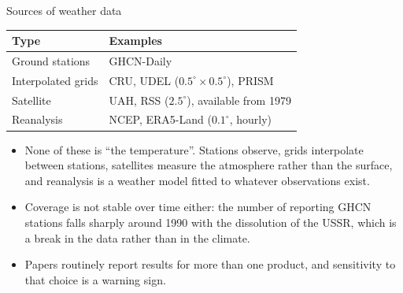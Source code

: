 \documentclass[aspectratio=169,10pt]{beamer}
\begin{document}
\begin{frame}{Sources of weather data}
  \begin{center}
    \small
    \begin{tabular}{@{}L{0.22\textwidth}L{0.58\textwidth}@{}}
      \toprule
      \textbf{Type} & \textbf{Examples} \\
      \midrule
      Ground stations & GHCN-Daily \\[3pt]
      Interpolated grids & CRU, UDEL ($0.5^\circ\times0.5^\circ$), PRISM \\[3pt]
      Satellite & UAH, RSS ($2.5^\circ$), available from 1979 \\[3pt]
      Reanalysis & NCEP, ERA5-Land ($0.1^\circ$, hourly) \\
      \bottomrule
    \end{tabular}
  \end{center}
  \vspace{2pt}
  \begin{itemize}
    \small
    \item None of these is ``the temperature''. Stations observe, grids interpolate
          between stations, satellites measure the atmosphere rather than the
          surface, and reanalysis is a weather model fitted to whatever observations
          exist.
    \item Coverage is not stable over time either: the number of reporting GHCN
          stations falls sharply around 1990 with the dissolution of the USSR, which
          is a break in the data rather than in the climate.
    \item Papers routinely report results for more than one product, and sensitivity
          to that choice is a warning sign.
  \end{itemize}
\end{frame}
\end{document}
